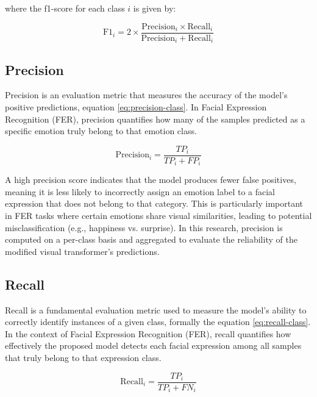 where the f1-score for each class $i$ is given by:

\begin{equation}
\text{F1}_i = 2 \times \frac{\text{Precision}_i \times \text{Recall}_i}{\text{Precision}_i + \text{Recall}_i}
\end{equation}


\subsection{Precision} 
\label{sub:precision}

Precision is an evaluation metric that measures the accuracy of the model’s positive predictions, equation \ref{eq:precision-class}. In Facial Expression Recognition (FER), precision quantifies how many of the samples predicted as a specific emotion truly belong to that emotion class.

\begin{equation}
\label{eq:precision-class}
\text{Precision}_i = \frac{TP_i}{TP_i + FP_i}
\end{equation}

A high precision score indicates that the model produces fewer false positives, meaning it is less likely to incorrectly assign an emotion label to a facial expression that does not belong to that category. This is particularly important in FER tasks where certain emotions share visual similarities, leading to potential misclassification (e.g., happiness vs. surprise). In this research, precision is computed on a per-class basis and aggregated to evaluate the reliability of the modified visual transformer’s predictions. 


\subsection{Recall} 
\label{sub:recall}

Recall is a fundamental evaluation metric used to measure the model’s ability to correctly identify instances of a given class, formally the equation \ref{eq:recall-class}. In the context of Facial Expression Recognition (FER), recall quantifies how effectively the proposed model detects each facial expression among all samples that truly belong to that expression class.

\begin{equation}
\label{eq:recall-class}
\text{Recall}_i = \frac{TP_i}{TP_i + FN_i}
\end{equation}

